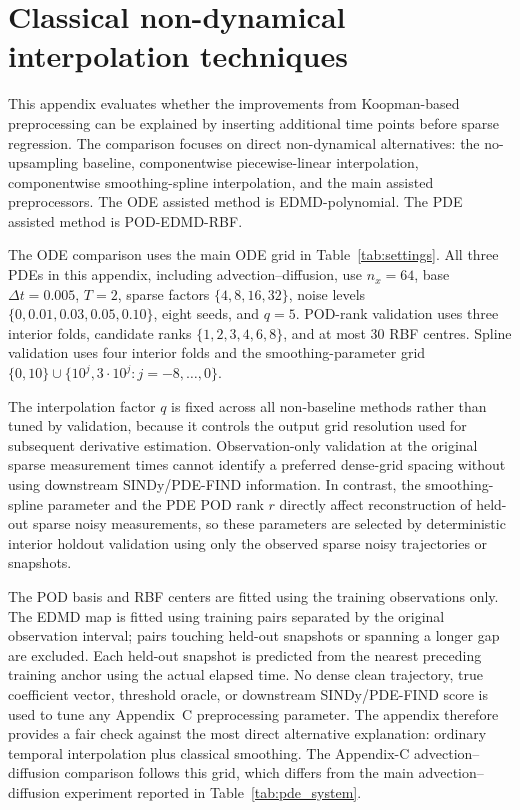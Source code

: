 \clearpage
\section{Classical non-dynamical interpolation techniques}
\label{app:classical_interpolation}

This appendix evaluates whether the improvements from Koopman-based preprocessing can be explained by inserting additional time points before sparse regression. The comparison focuses on direct non-dynamical alternatives: the no-upsampling baseline, componentwise piecewise-linear interpolation, componentwise smoothing-spline interpolation, and the main assisted preprocessors. The ODE assisted method is EDMD-polynomial. The PDE assisted method is POD-EDMD-RBF.

The ODE comparison uses the main ODE grid in Table~\ref{tab:settings}. All three PDEs in this appendix, including advection--diffusion, use $n_x=64$, base $\Delta t=0.005$, $T=2$, sparse factors $\{4,8,16,32\}$, noise levels $\{0,0.01,0.03,0.05,0.10\}$, eight seeds, and $q=5$. POD-rank validation uses three interior folds, candidate ranks $\{1,2,3,4,6,8\}$, and at most 30 RBF centres. Spline validation uses four interior folds and the smoothing-parameter grid $\{0,10\}\cup\{10^j,3\cdot10^j:j=-8,\ldots,0\}$.

The interpolation factor $q$ is fixed across all non-baseline methods rather than tuned by validation, because it controls the output grid resolution used for subsequent derivative estimation. Observation-only validation at the original sparse measurement times cannot identify a preferred dense-grid spacing without using downstream SINDy/PDE-FIND information. In contrast, the smoothing-spline parameter and the PDE POD rank $r$ directly affect reconstruction of held-out sparse noisy measurements, so these parameters are selected by deterministic interior holdout validation using only the observed sparse noisy trajectories or snapshots.

The POD basis and RBF centers are fitted using the training observations only. The EDMD map is fitted using training pairs separated by the original observation interval; pairs touching held-out snapshots or spanning a longer gap are excluded. Each held-out snapshot is predicted from the nearest preceding training anchor using the actual elapsed time. No dense clean trajectory, true coefficient vector, threshold oracle, or downstream SINDy/PDE-FIND score is used to tune any Appendix~C preprocessing parameter. The appendix therefore provides a fair check against the most direct alternative explanation: ordinary temporal interpolation plus classical smoothing. The Appendix-C advection--diffusion comparison follows this grid, which differs from the main advection--diffusion experiment reported in Table~\ref{tab:pde_system}.

